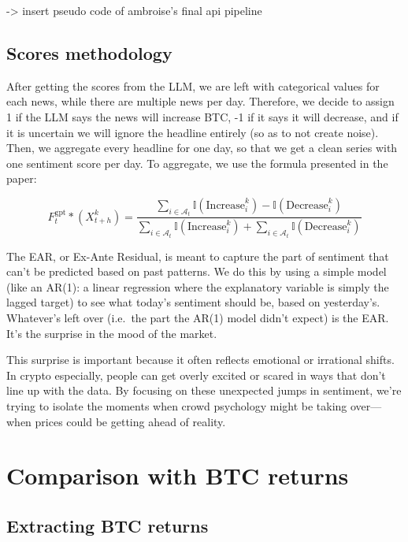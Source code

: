 \documentclass[
  a4paper]{article}
\begin{document}
-\textgreater{} insert pseudo code of ambroise's final api pipeline

\hypertarget{scores-methodology}{%
\subsection{Scores methodology}\label{scores-methodology}}

After getting the scores from the LLM, we are left with categorical
values for each news, while there are multiple news per day. Therefore,
we decide to assign 1 if the LLM says the news will increase BTC, -1 if
it says it will decrease, and if it is uncertain we will ignore the
headline entirely (so as to not create noise). Then, we aggregate every
headline for one day, so that we get a clean series with one sentiment
score per day. To aggregate, we use the formula presented in the paper:

\[
F^\text{gpt}_t *(X^k_{t+h}) = \frac{\sum_{i \in \mathcal{A}_t} \mathbb{I}(\text{Increase}^k_i) - \mathbb{I}(\text{Decrease}^k_i)}{\sum_{i \in \mathcal{A}_t} \mathbb{I}(\text{Increase}^k_i) + \sum_{i \in \mathcal{A}_t} \mathbb{I}(\text{Decrease}^k_i)}
\]

The EAR, or Ex-Ante Residual, is meant to capture the part of sentiment
that can't be predicted based on past patterns. We do this by using a
simple model (like an AR(1): a linear regression where the explanatory
variable is simply the lagged target) to see what today's sentiment
should be, based on yesterday's. Whatever's left over (i.e.~the part the
AR(1) model didn't expect) is the EAR. It's the surprise in the mood of
the market.

This surprise is important because it often reflects emotional or
irrational shifts. In crypto especially, people can get overly excited
or scared in ways that don't line up with the data. By focusing on these
unexpected jumps in sentiment, we're trying to isolate the moments when
crowd psychology might be taking over---when prices could be getting
ahead of reality.

\hypertarget{comparison-with-btc-returns}{%
\section{Comparison with BTC
returns}\label{comparison-with-btc-returns}}

\hypertarget{extracting-btc-returns}{%
\subsection{Extracting BTC returns}\label{extracting-btc-returns}}
\end{document}
